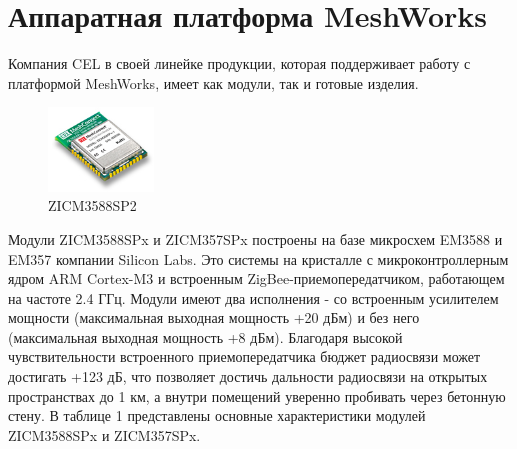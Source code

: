 \documentclass[12pt]{article}
\begin{document}
\section{Аппаратная платформа MeshWorks}
Компания CEL в своей линейке продукции, которая поддерживает работу с платформой 
MeshWorks, имеет как модули, так и готовые изделия.
\begin{figure}
  \begin{center}
    \includegraphics[width=0.25\textwidth]{mc_em358x_mini.jpg}
  \end{center}
  \caption{ZICM3588SP2}
\end{figure}
Модули ZICM3588SPx и ZICM357SPx построены на базе микросхем EM3588 и EM357 компании
Silicon Labs. Это системы на кристалле с микроконтроллерным ядром ARM Cortex-M3 и
встроенным ZigBee-приемопередатчиком, работающем на частоте 2.4 ГГц. Модули имеют
два исполнения - со встроенным усилителем мощности (максимальная выходная мощность
+20 дБм) и без него (максимальная выходная мощность +8 дБм). Благодаря высокой 
чувствительности встроенного приемопередатчика бюджет радиосвязи может достигать 
+123 дБ, что позволяет достичь дальности радиосвязи на открытых пространствах до 1 км,
а внутри помещений уверенно пробивать через бетонную стену. В таблице 1 представлены
основные характеристики модулей ZICM3588SPx и ZICM357SPx.
\end{document}
